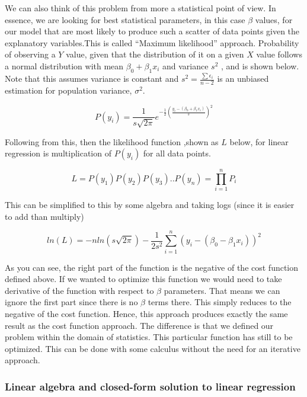 \documentclass[12pt,]{krantz}
\theoremstyle{definition}
\theoremstyle{definition}
\theoremstyle{definition}
\theoremstyle{remark}
\begin{document}
We can also think of this problem from more a statistical point of view.
In essence, we are looking for best statistical parameters, in this case
\(\beta\) values, for our model that are most likely to produce such a
scatter of data points given the explanatory variables.This is called
``Maximum likelihood'' approach. Probability of observing a \(Y\) value,
given that the distribution of it on a given \(X\) value follows a
normal distribution with mean \(\beta_0+\beta_1x_i\) and variance
\(s^2\) , and is shown below. Note that this assumes variance is
constant and \(s^2=\frac{\sum{\epsilon_i}}{n-2}\) is an unbiased
estimation for population variance, \(\sigma^2\).

\[P(y_{i})=\frac{1}{s\sqrt{2\pi} }e^{-\frac{1}{2}\left(\frac{y_i-(\beta_0 + \beta_1x_i)}{s}\right)^2}\]

Following from this, then the likelihood function ,shown as \(L\) below,
for linear regression is multiplication of \(P(y_{i})\) for all data
points.

\[L=P(y_1)P(y_2)P(y_3)..P(y_n)=\prod\limits_{i=1}^n{P_i}\]

This can be simplified to this by some algebra and taking logs (since it
is easier to add than multiply)

\[ln(L) = -nln(s\sqrt{2\pi}) - \frac{1}{2s^2} \sum\limits_{i=1}^n{(y_i-(\beta_0 - \beta_1x_i))^2} \]

As you can see, the right part of the function is the negative of the
cost function defined above. If we wanted to optimize this function we
would need to take derivative of the function with respect to \(\beta\)
parameters. That means we can ignore the first part since there is no
\(\beta\) terms there. This simply reduces to the negative of the cost
function. Hence, this approach produces exactly the same result as the
cost function approach. The difference is that we defined our problem
within the domain of statistics. This particular function has still to
be optimized. This can be done with some calculus without the need for
an iterative approach.

\hypertarget{linear-algebra-and-closed-form-solution-to-linear-regression}{%
\subsubsection{Linear algebra and closed-form solution to linear
regression}\label{linear-algebra-and-closed-form-solution-to-linear-regression}}
\end{document}
